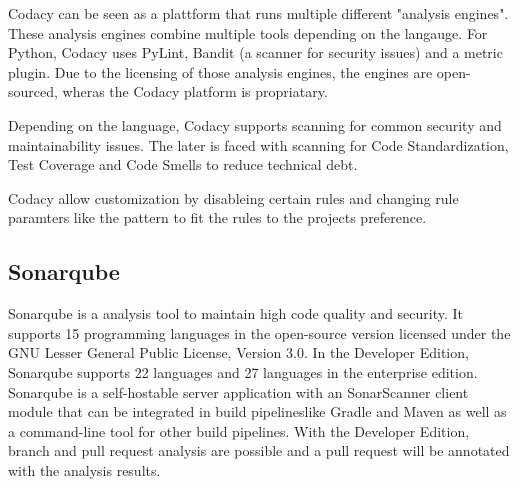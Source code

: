 Codacy can be seen as a plattform that runs multiple different "analysis engines". These analysis engines combine multiple tools depending on the langauge. For Python, Codacy uses  PyLint, Bandit (a scanner for security issues) and a metric plugin.
Due to the licensing of those analysis engines, the engines are open-sourced, wheras the Codacy platform is propriatary.

Depending on the language, Codacy supports scanning for common security and maintainability issues. The later is faced with scanning for Code Standardization, Test Coverage and Code Smells to reduce technical debt.

Codacy allow customization by disableing certain rules and changing rule paramters like the pattern to fit the rules to the projects preference. 

\subsection{Sonarqube}
Sonarqube is a analysis tool to maintain high code quality and security. It supports 15 programming languages in the open-source version licensed under the GNU Lesser General Public License, Version 3.0. In the Developer Edition, Sonarqube supports 22 languages and 27 languages in the enterprise edition. Sonarqube is a self-hostable server application with an SonarScanner client module that can be integrated in build pipelineslike Gradle and Maven as well as a command-line tool for other build pipelines. With the Developer Edition, branch and pull request analysis are possible and a pull request will be annotated with the analysis results.

